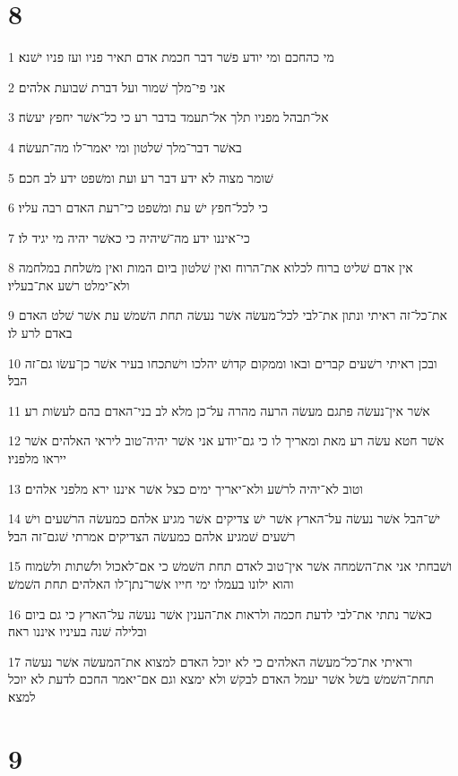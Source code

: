 \chapter{8}

\par 1 מי כהחכם ומי יודע פשׁר דבר חכמת אדם תאיר פניו ועז פניו ישׁנא׃
\par 2 אני פי־מלך שׁמור ועל דברת שׁבועת אלהים׃
\par 3 אל־תבהל מפניו תלך אל־תעמד בדבר רע כי כל־אשׁר יחפץ יעשׂה׃
\par 4 באשׁר דבר־מלך שׁלטון ומי יאמר־לו מה־תעשׂה׃
\par 5 שׁומר מצוה לא ידע דבר רע ועת ומשׁפט ידע לב חכם׃
\par 6 כי לכל־חפץ ישׁ עת ומשׁפט כי־רעת האדם רבה עליו׃
\par 7 כי־איננו ידע מה־שׁיהיה כי כאשׁר יהיה מי יגיד לו׃
\par 8 אין אדם שׁליט ברוח לכלוא את־הרוח ואין שׁלטון ביום המות ואין משׁלחת במלחמה ולא־ימלט רשׁע את־בעליו׃
\par 9 את־כל־זה ראיתי ונתון את־לבי לכל־מעשׂה אשׁר נעשׂה תחת השׁמשׁ עת אשׁר שׁלט האדם באדם לרע לו׃
\par 10 ובכן ראיתי רשׁעים קברים ובאו וממקום קדושׁ יהלכו וישׁתכחו בעיר אשׁר כן־עשׂו גם־זה הבל׃
\par 11 אשׁר אין־נעשׂה פתגם מעשׂה הרעה מהרה על־כן מלא לב בני־האדם בהם לעשׂות רע׃
\par 12 אשׁר חטא עשׂה רע מאת ומאריך לו כי גם־יודע אני אשׁר יהיה־טוב ליראי האלהים אשׁר ייראו מלפניו׃
\par 13 וטוב לא־יהיה לרשׁע ולא־יאריך ימים כצל אשׁר איננו ירא מלפני אלהים׃
\par 14 ישׁ־הבל אשׁר נעשׂה על־הארץ אשׁר ישׁ צדיקים אשׁר מגיע אלהם כמעשׂה הרשׁעים וישׁ רשׁעים שׁמגיע אלהם כמעשׂה הצדיקים אמרתי שׁגם־זה הבל׃
\par 15 ושׁבחתי אני את־השׂמחה אשׁר אין־טוב לאדם תחת השׁמשׁ כי אם־לאכול ולשׁתות ולשׂמוח והוא ילונו בעמלו ימי חייו אשׁר־נתן־לו האלהים תחת השׁמשׁ׃
\par 16 כאשׁר נתתי את־לבי לדעת חכמה ולראות את־הענין אשׁר נעשׂה על־הארץ כי גם ביום ובלילה שׁנה בעיניו איננו ראה׃
\par 17 וראיתי את־כל־מעשׂה האלהים כי לא יוכל האדם למצוא את־המעשׂה אשׁר נעשׂה תחת־השׁמשׁ בשׁל אשׁר יעמל האדם לבקשׁ ולא ימצא וגם אם־יאמר החכם לדעת לא יוכל למצא׃

\chapter{9}

